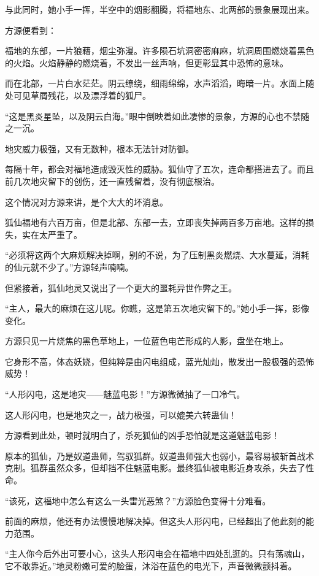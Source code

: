 \begin{this_body}
与此同时，她小手一挥，半空中的烟影翻腾，将福地东、北两部的景象展现出来。

方源便看到：

福地的东部，一片狼藉，烟尘弥漫。许多陨石坑洞密密麻麻，坑洞周围燃烧着黑色的火焰。火焰静静的燃烧着，不发出一丝声响，但更彰显其中恐怖的意味。

而在北部，一片白水茫茫。阴云缭绕，细雨绵绵，水声滔滔，晦暗一片。水面上随处可见草屑残花，以及漂浮着的狐尸。

“这是黑炎星坠，以及阴云白海。”眼中倒映着如此凄惨的景象，方源的心也不禁随之一沉。

地灾威力极强，又有无数种，根本无法针对防御。

每隔十年，都会对福地造成毁灭性的威胁。狐仙守了五次，连命都搭进去了。而且前几次地灾留下的创伤，还一直残留着，没有彻底根治。

这个情况对方源来讲，是个大大的坏消息。

狐仙福地有六百万亩，但是北部、东部一去，立即丧失掉两百多万亩地。这样的损失，实在太严重了。

“必须将这两个大麻烦解决掉啊，别的不说，为了压制黑炎燃烧、大水蔓延，消耗的仙元就不少了。”方源轻声喃喃。

但紧接着，狐仙地灵又说出了一个更大的噩耗异世作弊之王。

“主人，最大的麻烦在这儿呢。你瞧，这是第五次地灾留下的。”她小手一挥，影像变化。

方源只见一片烧焦的黑色草地上，一位蓝色电芒形成的人影，盘坐在地上。

它身形不高，体态妖娆，但纯粹是由闪电组成，蓝光灿灿，散发出一股极强的恐怖威势！

“人形闪电，这是地灾——魅蓝电影！”方源微微抽了一口冷气。

这人形闪电，也是地灾之一，战力极强，可以媲美六转蛊仙！

方源看到此处，顿时就明白了，杀死狐仙的凶手恐怕就是这道魅蓝电影！

原本的狐仙，乃是奴道蛊师，驾驭狐群。奴道蛊师强大也弱小，最容易被斩首战术克制。狐群虽然众多，但却挡不住魅蓝电影。最终狐仙被电影近身攻杀，失去了性命。

“该死，这福地中怎么有这么一头雷光恶煞？”方源脸色变得十分难看。

前面的麻烦，他还有办法慢慢地解决掉。但这头人形闪电，已经超出了他此刻的能力范围。

“主人你今后外出可要小心，这头人形闪电会在福地中四处乱逛的。只有荡魂山，它不敢靠近。”地灵粉嫩可爱的脸蛋，沐浴在蓝色的电光下，声音微微颤抖着。


\end{this_body}
